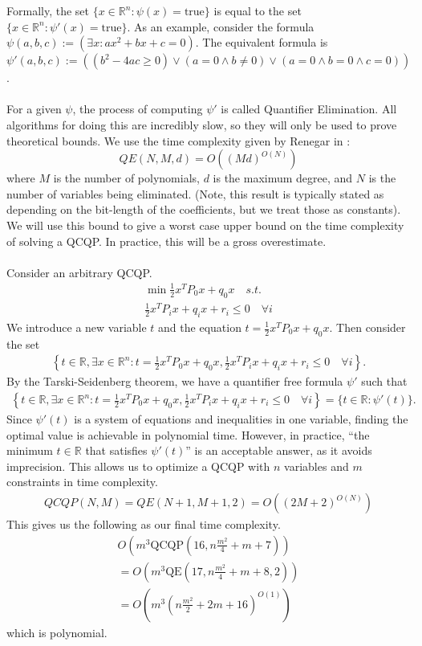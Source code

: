 \documentclass[a4paper]{amsart}
\theoremstyle{remark}
\begin{document}
\noindent
Formally, the set $\{x \in \mathbb{R}^n:\psi(x)=\textrm{true}\}$ is equal to the set $\{x \in \mathbb{R}^n:\psi'(x)=\textrm{true}\}$. As an example, consider the formula $\psi(a,b,c):=(\exists x: ax^2+bx+c=0)$. The equivalent formula is $\psi'(a,b,c):=\left((b^2-4ac \geq 0) \vee (a=0 \wedge b \neq 0) \vee (a = 0 \wedge b = 0 \wedge c = 0)\right)$.\\\\
For a given $\psi$, the process of computing $\psi'$ is called Quantifier Elimination. All algorithms for doing this are incredibly slow, so they will only be used to prove theoretical bounds. We use the time complexity given by Renegar in \cite{Re92}:
$$QE(N,M,d) = O\left( (Md)^{O(N)}\right)$$
\noindent
where $M$ is the number of polynomials, $d$ is the maximum degree, and $N$ is the number of variables being eliminated. (Note, this result is typically stated as depending on the bit-length of the coefficients, but we treat those as constants). We will use this bound to give a worst case upper bound on the time complexity of solving a QCQP. In practice, this will be a gross overestimate.\\\\
Consider an arbitrary QCQP.
\begin{gather*}
	\min \frac{1}{2}x^TP_0x+q_0x \quad s.t.\\
	\frac{1}{2}x^TP_ix+q_ix+r_i \leq 0 \quad \forall i
\end{gather*}
We introduce a new variable $t$ and the equation $t = \frac{1}{2}x^TP_0x+q_0x$. Then consider the set
\begin{align*}
	\left\{t \in \mathbb{R}, \exists x \in \mathbb{R}^n: t = \frac{1}{2}x^TP_0x+q_0x, \frac{1}{2}x^TP_ix+q_ix+r_i \leq 0 \quad \forall i \right\}. 
\end{align*}
By the Tarski-Seidenberg theorem, we have a quantifier free formula $\psi'$ such that
\begin{align*}
	\left\{t \in \mathbb{R}, \exists x \in \mathbb{R}^n: t = \frac{1}{2}x^TP_0x+q_0x, \frac{1}{2}x^TP_ix+q_ix+r_i \leq 0 \quad \forall i \right\} = \{t\in \mathbb{R}: \psi'(t)\}.
\end{align*}
Since $\psi'(t)$ is a system of equations and inequalities in one variable, finding the optimal value is achievable in polynomial time. However, in practice, ``the minimum $t \in \mathbb{R}$ that satisfies $\psi'(t)$'' is an acceptable answer, as it avoids imprecision. This allows us to optimize a QCQP with $n$ variables and $m$ constraints in time complexity.
\begin{gather*}
	QCQP(N,M)=QE(N+1,M+1,2)=O\left((2M+2)^{O(N)} \right)
\end{gather*}
This gives us the following as our final time complexity. 
\begin{gather*}
	O \left(m^3 \textrm{QCQP}\left(16,n\frac{m^2}{4}+m+7\right) \right)\\
	= O\left(m^3\textrm{QE}\left(17,n\frac{m^2}{4}+m+8, 2\right) \right)\\
	= O\left(m^3\left(n\frac{m^2}{2}+2m+16\right)^{O(1)}\right)
\end{gather*}
which is polynomial.
\end{document}
